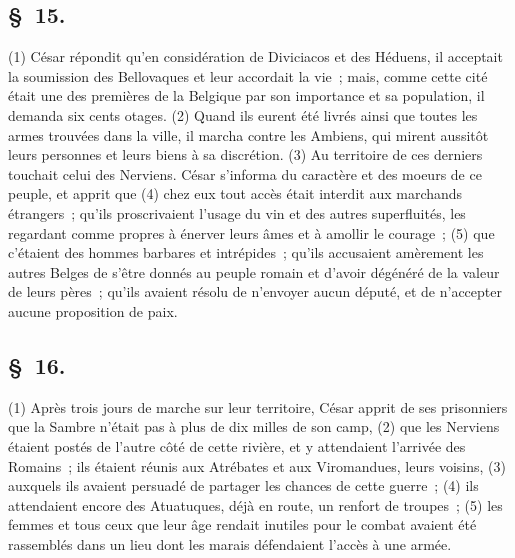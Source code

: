 \documentclass[french,twoside]{book} %
\begin{document}
\subsection[{§ 15.}]{ \textsc{§ 15.} }
\noindent (1) César répondit qu’en considération de Diviciacos et des Héduens, il acceptait la soumission des Bellovaques et leur accordait la vie ; mais, comme cette cité était une des premières de la Belgique par son importance et sa population, il demanda six cents otages. (2) Quand ils eurent été livrés ainsi que toutes les armes trouvées dans la ville, il marcha contre les Ambiens, qui mirent aussitôt leurs personnes et leurs biens à sa discrétion. (3) Au territoire de ces derniers touchait celui des Nerviens. César s’informa du caractère et des moeurs de ce peuple, et apprit que (4) chez eux tout accès était interdit aux marchands étrangers ; qu’ils proscrivaient l’usage du vin et des autres superfluités, les regardant comme propres à énerver leurs âmes et à amollir le courage ; (5) que c’étaient des hommes barbares et intrépides ; qu’ils accusaient amèrement les autres Belges de s’être donnés au peuple romain et d’avoir dégénéré de la valeur de leurs pères ; qu’ils avaient résolu de n’envoyer aucun député, et de n’accepter aucune proposition de paix.
\subsection[{§ 16.}]{ \textsc{§ 16.} }
\noindent (1) Après trois jours de marche sur leur territoire, César apprit de ses prisonniers que la Sambre n’était pas à plus de dix milles de son camp, (2) que les Nerviens étaient postés de l’autre côté de cette rivière, et y attendaient l’arrivée des Romains ; ils étaient réunis aux Atrébates et aux Viromandues, leurs voisins, (3) auxquels ils avaient persuadé de partager les chances de cette guerre ; (4) ils attendaient encore des Atuatuques, déjà en route, un renfort de troupes ; (5) les femmes et tous ceux que leur âge rendait inutiles pour le combat avaient été rassemblés dans un lieu dont les marais défendaient l’accès à une armée.
\end{document}
